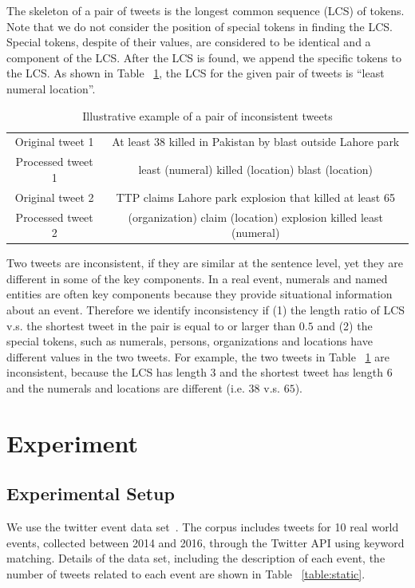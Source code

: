\documentclass[envcountsame]{llncs}
\begin{document}
The skeleton of a pair of tweets is the longest common sequence (LCS) of tokens. Note that we do not consider the position of special tokens in finding the LCS. Special tokens, despite of their values, are considered to be identical and a component of the LCS. After the LCS is found, we append the specific tokens to the LCS. As shown in Table ~\ref{tab:example}, the LCS for the given pair of tweets is ``least numeral location''.

\vspace{-0.6cm}
\begin{table}
\caption{Illustrative example of a pair of inconsistent tweets}\label{tab:example}
\begin{tabular}{|c|c|}
\hline
Original tweet 1 & At least 38 killed in Pakistan by blast outside Lahore park \\
Processed tweet 1  & least (numeral) killed  (location) blast  (location)\\\hline
Original tweet 2 & TTP claims Lahore park explosion that killed at least 65 \\
Processed tweet 2& (organization) claim (location) explosion killed least (numeral)\\\hline
\end{tabular}
\end{table}
\vspace{-0.6cm}

Two tweets are inconsistent, if they are similar at the sentence level, yet they are different in some of the key components. In a real event, numerals and named entities are often key components because they provide situational information about an event. Therefore we identify inconsistency if (1) the length ratio of LCS v.s. the shortest tweet in the pair is equal to or larger than $0.5$ and (2) the special tokens, such as numerals, persons, organizations and locations have different values in the two tweets. For example, the two tweets in Table ~\ref{tab:example} are inconsistent, because the LCS has length $3$ and the shortest tweet has length $6$ and the numerals and locations are different (i.e. $38$ v.s. $65$).

\section{Experiment}\label{sec:experiment}
\subsection{Experimental Setup}
We use the twitter event data set~\cite{ZubiagaTwitterDatasets}. The corpus includes tweets for 10 real world events, collected between 2014 and 2016, through the Twitter API using keyword matching. Details of the data set, including the description of each event, the number of tweets related to each event are shown in Table ~\ref{table:static}.
\end{document}
